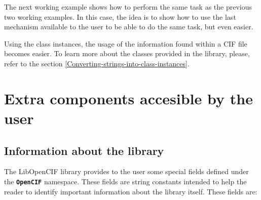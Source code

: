\documentclass[11pt,twoside,openany,x11names,svgnames]{memoir}
\begin{document}
The next working example shows how to perform the same task as the previous two working examples. In this case, the idea is to show how to use the last mechanism available to the user to be able to do the same task, but even easier.



Using the class instances, the usage of the information found within a CIF file becomes easier. To learn more about the classes provided in the library, please, refer to the section \ref{Converting-strings-into-class-instances}.

\section{Extra components accesible by the user}\label{Extra-components-accesible-by-the-user}

\subsection{Information about the library}

The LibOpenCIF library provides to the user some special fields defined under the \textbf{\texttt{OpenCIF}} namespace. These fields are string constants intended to help the reader to identify important information about the library itself. These fields are:
\end{document}
